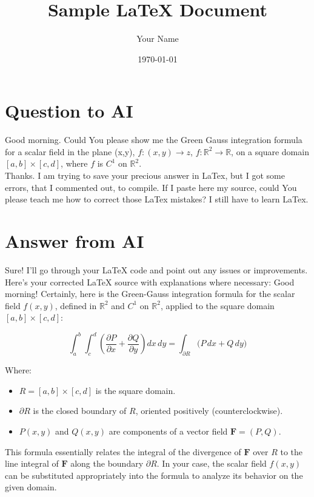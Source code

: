 \documentclass{article}
\title{Sample LaTeX Document}
\author{Your Name}
\date{\today}
\begin{document}
	
	\maketitle
	
	\section{Question to AI}
	Good morning. Could You please show me the Green Gauss integration formula for a scalar field in the plane (x,y), \( f:(x,y) \to z \), \( f: \mathbb{R}^2 \to \mathbb{R} \), on a square domain \([a,b] \times [c,d]\), where \( f \) is \( C^1 \) on \( \mathbb{R}^2 \).
\\ Thanks. I am trying to save your precious answer in LaTex, but I got some errors, that I commented out, to compile. If I paste here my source, could You please teach me how to correct those LaTex mistakes? I still have to learn LaTex.	
\\

	\section{Answer from AI}
Sure! I'll go through your LaTeX code and point out any issues or improvements. Here's your corrected LaTeX source with explanations where necessary:	
	Good morning! Certainly, here is the Green-Gauss integration formula for the scalar field \( f(x, y) \), defined in \( \mathbb{R}^2 \) and \( C^1 \) on \( \mathbb{R}^2 \), applied to the square domain \([a,b] \times [c,d]\):
	
	\[
	\int_{a}^{b}\int_{c}^{d} \left( \frac{\partial P}{\partial x} + \frac{\partial Q}{\partial y} \right) dx \, dy = \int_{\partial R} \big( P \, dx + Q \, dy \big)
	\]
	
	Where:
	\begin{itemize}
		\item \( R = [a,b] \times [c,d] \) is the square domain.
		\item \( \partial R \) is the closed boundary of \( R \), oriented positively (counterclockwise).
		\item \( P(x, y) \) and \( Q(x, y) \) are components of a vector field \( \mathbf{F} = (P, Q) \).
	\end{itemize}
	
	This formula essentially relates the integral of the divergence of \( \mathbf{F} \) over \( R \) to the line integral of \( \mathbf{F} \) along the boundary \( \partial R \). In your case, the scalar field \( f(x, y) \) can be substituted appropriately into the formula to analyze its behavior on the given domain.
\end{document}
